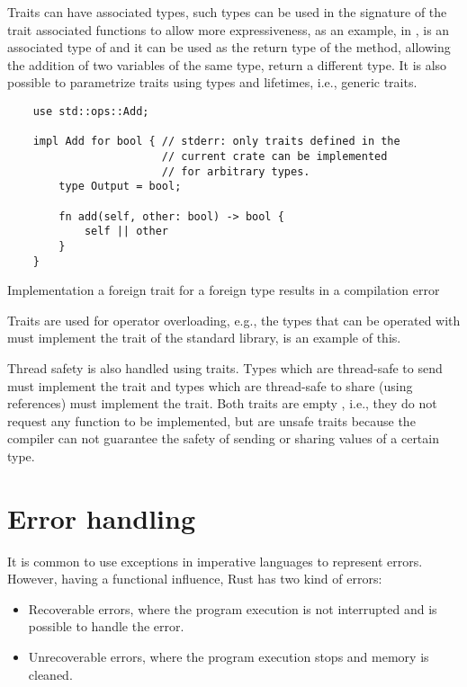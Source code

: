 Traits can have associated types, such types can be used in the signature of the
trait associated functions to allow more expressiveness, as an example, in
,  is an associated type of
 and it can be used as the return type of the  method,
allowing the addition of two variables of the same type, return a different
type. It is also possible to parametrize traits using types and lifetimes, i.e.,
generic traits.

\begin{listing}[ht]
	\begin{verbatim}
    use std::ops::Add;

    impl Add for bool { // stderr: only traits defined in the
                        // current crate can be implemented 
                        // for arbitrary types.
        type Output = bool;
        
        fn add(self, other: bool) -> bool {
            self || other
        }
    }
    \end{verbatim}
  \caption{Implementation a foreign trait for a foreign type results in a compilation error}
  \label{lst:foreign_trait_foreign_impl}
\end{listing}

Traits are used for operator overloading, e.g., the types that can be operated
with \inrust{+} must implement the  trait of the standard library,
 is an example of this. 

Thread safety is also handled using traits. Types which are thread-safe to send
must implement the  trait and types which are thread-safe to share
(using references) must implement the  trait. Both traits are empty
, i.e., they do not request any function to be implemented, but are unsafe
traits because the compiler can not guarantee the safety of sending or sharing
values of a certain type.

\section{Error handling}

It is common to use exceptions in imperative languages to represent errors.
However, having a functional influence, Rust has two kind of errors: 

\begin{itemize}
    \item Recoverable errors, where the program execution is not interrupted and
        is possible to handle the error.
    \item Unrecoverable errors, where the program execution stops and memory is
        cleaned.
\end{itemize}

